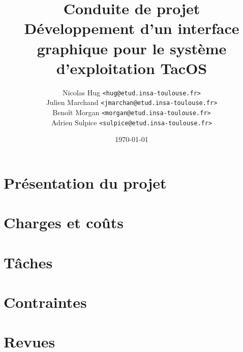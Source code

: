 \documentclass[titlepage]{article}
\title{Conduite de projet \\ Développement d'un interface graphique pour le système d'exploitation TacOS}
\author{Nicolas Hug \texttt{<hug@etud.insa-toulouse.fr>}\\
Julien Marchand \texttt{<jmarchan@etud.insa-toulouse.fr>}\\
Benoît Morgan \texttt{<morgan@etud.insa-toulouse.fr>}\\
Adrien Sulpice \texttt{<sulpice@etud.insa-toulouse.fr>}}
\date{\today}
\begin{document}
\maketitle

\newpage
\tableofcontents

\newpage


\section{Présentation du projet}


\clearpage

\section{Charges et coûts}


\clearpage

\section{Tâches}


\clearpage

\section{Contraintes}


\clearpage

\section{Revues}

\end{document}
